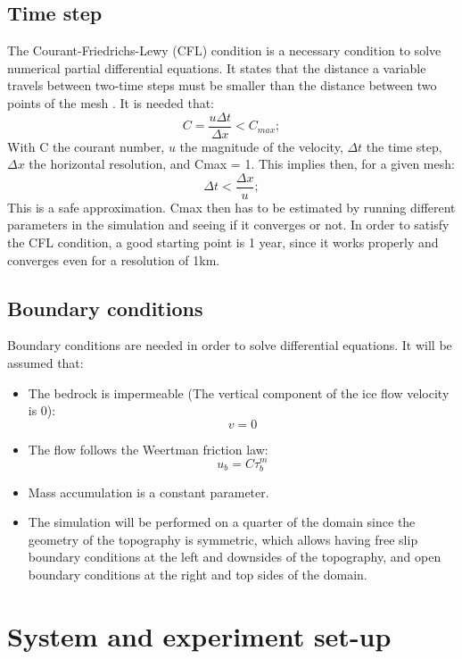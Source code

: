 \documentclass{article}
\begin{document}
\subsection{Time step}
The Courant-Friedrichs-Lewy (CFL) condition is a necessary condition to solve numerical partial differential equations. It states that the distance a variable travels between two-time steps must be smaller than the distance between two points of the mesh \cite[]{courant1967partial}. It is needed that:
\begin{equation}
	C=\frac{u\Delta t}{\Delta x}<C_{max};
\end{equation}
With C the courant number, $u$ the magnitude of the velocity, $\Delta t$ the time step, $\Delta x$ the horizontal resolution, and Cmax = 1. This implies then, for a given mesh:
\begin{equation}
	\Delta t < \frac{\Delta x}{u};
\end{equation}
This is a safe approximation. Cmax then has to be estimated by running different parameters in the simulation and seeing if it converges or not. In order to satisfy the CFL condition, a good starting point is 1 year, since it works properly and converges even for a resolution of 1km.
\subsection{Boundary conditions}
Boundary conditions are needed in order to solve differential equations. It will be assumed that:
\begin{itemize}
	\item The bedrock is impermeable (The vertical component of the ice flow velocity is 0):
	\begin{equation}
		v = 0
	\end{equation}
	\item The flow follows the Weertman friction law:
	\begin{equation}
		u_b = C\tau_b^m
	\end{equation}
	\item Mass accumulation is a constant parameter.
	\item The simulation will be performed on a quarter of the domain since the geometry of the topography is symmetric, which allows having free slip boundary conditions at the left and downsides of the topography, and open boundary conditions at the right and top sides of the domain. 
\end{itemize}

\section{System and experiment set-up}
\label{Systems}
\end{document}
